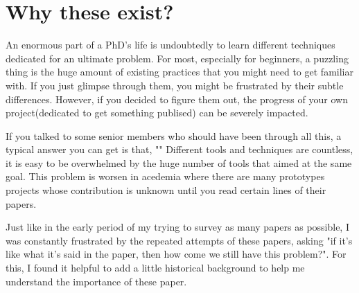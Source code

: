 \section{Why these exist?}
An enormous part of a PhD's life is undoubtedly to learn different techniques dedicated for an ultimate problem.
For most, especially for beginners, a puzzling thing is the huge amount of existing practices that you might need to get familiar with.
If you just glimpse through them, you might be frustrated by their subtle differences.
However, if you decided to figure them out, the progress of your own project(dedicated to get something publised) can be severely impacted.

If you talked to some senior members who should have been through all this, a typical answer you can get is that, ""
Different tools and techniques are countless, it is easy to be overwhelmed by the huge number of tools that aimed at the same goal.
This problem is worsen in acedemia where there are many prototypes projects whose contribution is unknown until you read certain lines of their papers.

Just like in the early period of my trying to survey as many papers as possible, I was constantly frustrated by the repeated attempts of these papers, 
asking "if it's like what it's said in the paper, then how come we still have this problem?".
For this, I found it helpful to add a little historical background to help me understand the importance of these paper.

